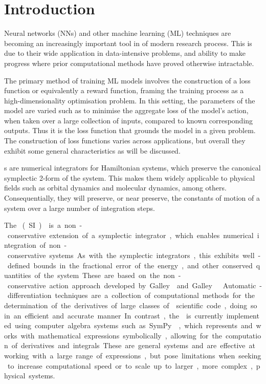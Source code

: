 \section{Introduction}

Neural networks (NNs) and other machine learning (ML) techniques are becoming an increasingly important tool in of modern research process. This is due to their wide application in data-intensive problems, and ability to make progress where prior computational methods have proved otherwise intractable.

The primary method of training ML models involves the construction of a loss function or equivalently a reward function, framing the training process as a high-dimensionality optimisation problem.
In this setting, the parameters of the model are varied such as to minimise the aggregate loss of the model's action, when taken over a large collection of inputs, compared to known corresponding outputs.
Thus it is the loss function that grounds the model in a given problem.
The construction of loss functions varies across applications, but overall they exhibit some general characteristics as will be discussed.

\SymI{}s are numerical integrators for Hamiltonian systems, which preserve the canonical symplectic 2-form of the system. 
This makes them widely applicable to physical fields such as orbital dynamics and  molecular dynamics, among others.%
%
Consequentially, they will preserve, or near preserve, the constants of motion of a system over a large number of integration steps.

The \SI{} (SI)\cite{tsangSLIMPLECTICINTEGRATORSVARIATIONAL2015} is a non-conservative extension of a symplectic integrator, which enables numerical integration of non-conservative systems. As with the symplectic integrators, this exhibits well-defined bounds in the fractional error of the energy, and other conserved quantities of the system. These are based on the non-conservative action approach developed by Galley \cite{galleyClassicalMechanicsNonconservative2013} and Galley \etall \cite{galleyPrincipleStationaryNonconservative2014}.

Automatic-differentiation techniques are a collection of computational methods for the determination of the derivatives of large classes of scientific code, doing so in an efficient and accurate manner. In contrast, the \SI{} is currently implemented using computer algebra systems such as SymPy \cite{sympy}, which represents and works with mathematical expressions symbolically, allowing for the computation of derivatives and integrals. These are general systems and are effective at working with a large range of expressions, but pose limitations when seeking to increase computational speed or to scale up to larger, more complex, physical systems.

